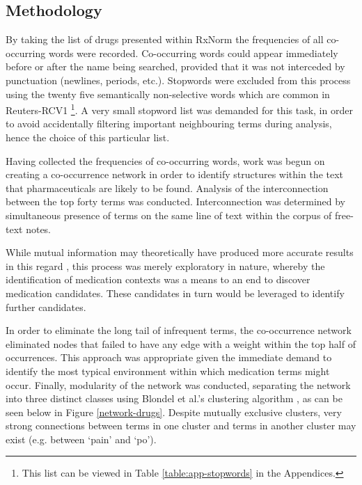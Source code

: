 \subsection{Methodology} 
 \label{section:pharmaceutical-retrieval-methodology}
 

By taking the list of drugs presented within RxNorm the frequencies of all co-occurring words were recorded. Co-occurring words could appear immediately before or after the name being searched, provided that it was not interceded by punctuation (newlines, periods, etc.). Stopwords were excluded from this process using the twenty five semantically non-selective words which are common in Reuters-RCV1\cite{sanderson2010christopher} \footnote{This list can be viewed in Table \ref{table:app-stopwords} in the Appendices.}.
 A very small stopword list was demanded for this task, in order to avoid accidentally filtering important neighbouring terms during analysis, hence the choice of this particular list. 

Having collected the frequencies of co-occurring words, work was begun on creating a co-occurrence network in order to identify structures within the text that pharmaceuticals are likely to be found. Analysis of the interconnection between the top forty terms was conducted. Interconnection was determined by simultaneous presence of terms on the same line of text within the corpus of free-text notes. 

While mutual information may theoretically have produced more accurate results in this regard \cite{nakagawa2003automatic}, this process was merely exploratory in nature, whereby the identification of medication contexts was a means to an end to discover medication candidates. These candidates in turn would be leveraged to identify further candidates. 

In order to eliminate the long tail of infrequent terms, the co-occurrence network eliminated nodes that failed to have any edge with a weight within the top half of occurrences. This approach was appropriate given the immediate demand to identify the most typical environment within which medication terms might occur. Finally, modularity of the network was conducted, separating the network into three distinct classes using Blondel et al.'s clustering algorithm \cite{blondel2008fast}, as can be seen below in Figure \ref{network-drugs}. Despite mutually exclusive clusters, very strong connections between terms in one cluster and terms in another cluster may exist  (e.g. between `pain' and `po').


